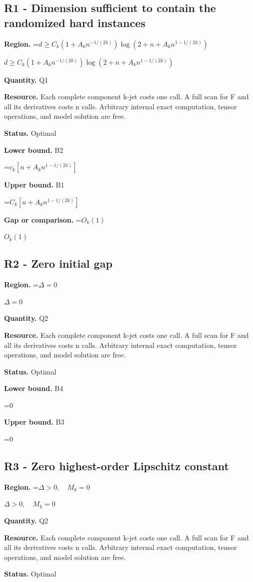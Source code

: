 \documentclass[10pt,a4paper]{article}
\newcommand{\AtlasMath}[1]{\par\begingroup\centering\setbox0=\hbox{$\displaystyle #1$}\ifdim\wd0>1.4\linewidth\typeout{ATLAS WIDE FORMULA: \the\wd0}\fi\ifdim\wd0>\linewidth\resizebox{\linewidth}{!}{\box0}\else\box0\fi\par\endgroup}
\newcommand{\AtlasInlineMath}[1]{\begingroup\setbox0=\hbox{$#1$}\ifdim\wd0>.4\linewidth\endgroup\AtlasMath{#1}\else\endgroup$#1$\fi}
\begin{document}
\subsection{R1 - Dimension sufficient to contain the randomized hard instances}
\textbf{Region.} \AtlasInlineMath{d\ge C_k(1+A_kn^{-1/(2k)})\log(2+n+A_kn^{1-1/(2k)})}

\textbf{Quantity.} Q1

\textbf{Resource.} Each complete component k-jet costs one call. A full scan for F and all its derivatives costs n calls. Arbitrary internal exact computation, tensor operations, and model solution are free.

\textbf{Status.} Optimal

\textbf{Lower bound.} B2

\AtlasMath{c_k[n+A_kn^{1-1/(2k)}]}
\textbf{Upper bound.} B1

\AtlasMath{C_k[n+A_kn^{1-1/(2k)}]}
\textbf{Gap or comparison.} \AtlasInlineMath{O_k(1)}

\subsection{R2 - Zero initial gap}
\textbf{Region.} \AtlasInlineMath{\Delta=0}

\textbf{Quantity.} Q2

\textbf{Resource.} Each complete component k-jet costs one call. A full scan for F and all its derivatives costs n calls. Arbitrary internal exact computation, tensor operations, and model solution are free.

\textbf{Status.} Optimal

\textbf{Lower bound.} B4

\AtlasMath{0}
\textbf{Upper bound.} B3

\AtlasMath{0}
\subsection{R3 - Zero highest-order Lipschitz constant}
\textbf{Region.} \AtlasInlineMath{\Delta>0,\quad M_k=0}

\textbf{Quantity.} Q2

\textbf{Resource.} Each complete component k-jet costs one call. A full scan for F and all its derivatives costs n calls. Arbitrary internal exact computation, tensor operations, and model solution are free.

\textbf{Status.} Optimal
\end{document}
